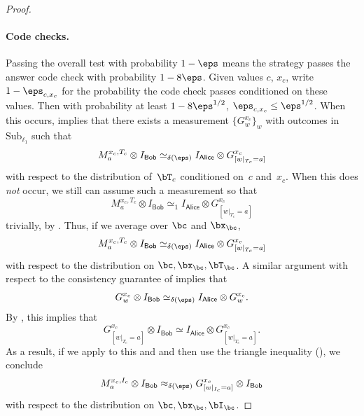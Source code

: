 \documentclass[11pt]{article}
\newcommand{\codes}{\mathrm{Sub}}
\newcommand{\consistency}{\simeq}
\newcommand{\reg}[1]{{\mathsf{#1}}}
\begin{document}
\begin{proof}
\paragraph{Code checks.}
Passing the overall test with probability $1-\eps$
means the strategy passes the answer code check with probability $1-8\eps$.
Given values $c $, $x_{c}$, write $1-\eps_{c, x_{c}}$ for the probability the code check passes conditioned on these values.
Then with probability at least $1-8\eps^{1/2}$, $\eps_{c, x_{c}} \leq \eps^{1/2}$.
When this occurs,  implies that there exists a measurement $\{G^{x_c}_w\}_w$ with outcomes in $\codes_{\ell_1}$ such that
\begin{equation*}
M^{x_c, T_c}_a \otimes I_{\reg{Bob}}\consistency_{\delta(\eps)} I_{\reg{Alice}} \otimes G^{x_c}_{[w|_{T_c} = a]}
\end{equation*}
with respect to the distribution of~$\bT_c$ conditioned on~$c$ and~${x}_{c}$.
When this does \emph{not} occur, we still can assume such a measurement so that
\begin{equation*}
M^{x_c, T_c}_a \otimes I_{\reg{Bob}}\consistency_{1} I_{\reg{Alice}} \otimes G^{x_c}_{[w|_{T_c} = a]}
\end{equation*}
trivially, by . Thus, if we average over $\bc$ and $\bx_{\bc}$,
\begin{equation}\label{eq:almost-at-tweedledee}
M^{x_c, T_c}_a \otimes I_{\reg{Bob}}\consistency_{\delta(\eps)} I_{\reg{Alice}} \otimes G^{x_c}_{[w|_{T_c} = a]}
\end{equation}
with respect to the distribution on $\bc, \bx_{\bc}, \bT_{\bc}$.
A similar argument with respect to the consistency guarantee of  implies that
\begin{equation}\label{eq:consistency-of-the-encoding}
G^{x_c}_w \otimes I_{\reg{Bob}} \consistency_{\delta(\eps)} I_{\reg{Alice}} \otimes G^{x_c}_w.
\end{equation}
By , this implies that
\begin{equation*}
G^{x_c}_{[w|_{T_c} = a]} \otimes I_{\reg{Bob}} \consistency I_{\reg{Alice}} \otimes G^{x_c}_{[w|_{T_c} = a]}.
\end{equation*}
As a result, if we apply  to this and  and then use the triangle inequality (), we conclude
\begin{equation}\label{eq:tweedledee}
M^{x_c, I_c}_a \otimes I_{\reg{Bob}}\approx_{\delta(\eps)}G^{x_c}_{[w|_{I_c} = a]} \otimes  I_{\reg{Bob}}
\end{equation}
with respect to the distribution on $\bc, \bx_{\bc}, \bI_{\bc}$.


\end{proof}
\end{document}
